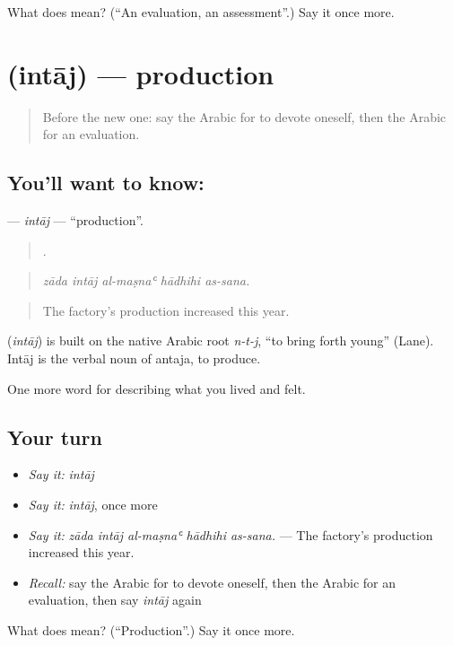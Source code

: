 \begin{tcolorbox}[breakable,colback=teal!4,colframe=teal!35!black,title={Before you move on}]
What does  mean? (\textquotedblleft{}An evaluation, an assessment\textquotedblright{}.) Say it once more.
\end{tcolorbox}
\section[\texorpdfstring{\ar{إنتاج} (intāj)}{إنتاج (intāj)}]{ (intāj) — production}

\label{lesson:AR-C523-intaj}



\begin{quote}
Before the new one: say the Arabic for to devote oneself, then the Arabic for an evaluation.
\end{quote}

\subsection*{You'll want to know: }
\textbf{} — \emph{intāj} — \textquotedblleft{}production\textquotedblright{}.

\begin{quote}
    .
\end{quote}

\begin{quote}
\emph{zāda intāj al-maṣnaʿ hādhihi as-sana.}
\end{quote}

\begin{quote}
The factory's production increased this year.
\end{quote}

\begin{cousinweb}
\textbf{} (\emph{intāj}) is built on the native Arabic root \emph{n-t-j}, \textquotedblleft{}to bring forth young\textquotedblright{} (Lane). Intāj is the verbal noun of antaja, to produce.
\end{cousinweb}

\begin{grammarlens}[title={What you've built}]
One more word for describing what you lived and felt.
\end{grammarlens}

\subsection*{Your turn}
\begin{itemize}
\raggedright
  \item \emph{Say it:} \emph{intāj}
  \item \emph{Say it:} \emph{intāj}, once more
  \item \emph{Say it:} \emph{zāda intāj al-maṣnaʿ hādhihi as-sana.} — The factory's production increased this year.
  \item \emph{Recall:} say the Arabic for to devote oneself, then the Arabic for an evaluation, then say \emph{intāj} again
\end{itemize}

\begin{tcolorbox}[breakable,colback=teal!4,colframe=teal!35!black,title={Before you move on}]
What does  mean? (\textquotedblleft{}Production\textquotedblright{}.) Say it once more.
\end{tcolorbox}
